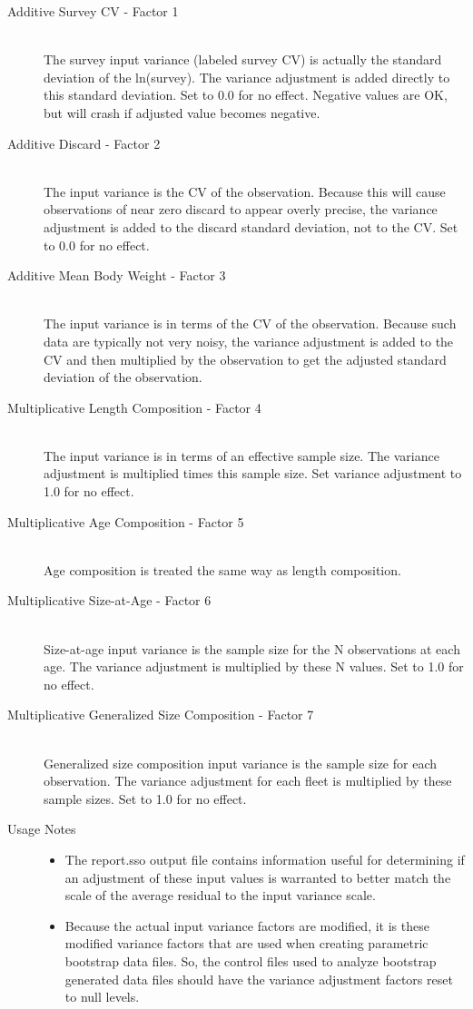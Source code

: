 \begin{description}
	\item[Additive Survey CV - Factor 1]\hfil\\
	The survey input variance (labeled survey CV) is actually the standard deviation of the ln(survey).  The variance adjustment is added directly to this standard deviation.  Set to 0.0 for no effect.  Negative values are OK, but will crash if adjusted value becomes negative.
	\item[Additive Discard - Factor 2]\hfil\\
	The input variance is the CV of the observation.  Because this will cause observations of near zero discard to appear overly precise, the variance adjustment is added to the discard standard deviation, not to the CV.  Set to 0.0 for no effect.
	\item[Additive Mean Body Weight - Factor 3]\hfil\\
	The input variance is in terms of the CV of the observation.  Because such data are typically not very noisy, the variance adjustment is added to the CV and then multiplied by the observation to get the adjusted standard deviation of the observation.
	\item[Multiplicative Length Composition - Factor 4]\hfil\\
	The input variance is in terms of an effective sample size.  The variance adjustment is multiplied times this sample size.  Set variance adjustment to 1.0 for no effect.
	\item[Multiplicative Age Composition - Factor 5]\hfill\\
	Age composition is treated the same way as length composition.
	\item[Multiplicative Size-at-Age - Factor 6]\hfill\\
	Size-at-age input variance is the sample size for the N observations at each age.  The variance adjustment is multiplied by these N values. Set to 1.0 for no effect.
	\item[Multiplicative Generalized Size Composition - Factor 7]\hfill\\
	Generalized size composition input variance is the sample size for each observation.  The variance adjustment for each fleet is multiplied by these sample sizes. Set to 1.0 for no effect.
	\item[Usage Notes]\hfill
	\begin{itemize}
		\item The report.sso output file contains information useful for determining if an adjustment of these input values is warranted to better match the scale of the average residual to the input variance scale.
		\item Because the actual input variance factors are modified, it is these modified variance factors that are used when creating parametric bootstrap data files.  So, the control files used to analyze bootstrap generated data files should have the variance adjustment factors reset to null levels.
	\end{itemize}
\end{description}

